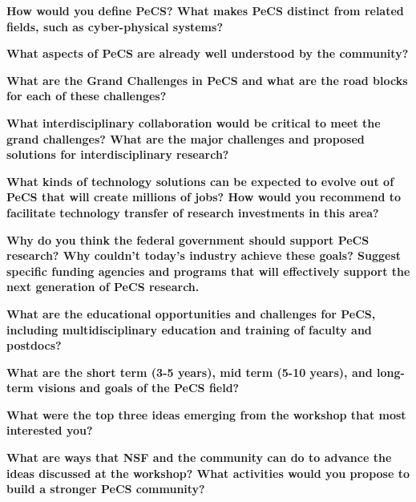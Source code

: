 \begin{flushenumbf}

\item \textbf{How would you define PeCS? What makes PeCS distinct from
related fields, such as cyber-physical systems?}

\item \textbf{What aspects of PeCS are already well understood by the
community?}

\item \textbf{What are the Grand Challenges in PeCS and what are the road
blocks for each of these challenges?}

\item \textbf{What interdisciplinary collaboration would be critical to meet
the grand challenges? What are the major challenges and proposed solutions
for interdisciplinary research?}

\item \textbf{What kinds of technology solutions can be expected to evolve
out of PeCS that will create millions of jobs? How would you recommend to
facilitate technology transfer of research investments in this area?}

\item \textbf{Why do you think the federal government should support PeCS
research? Why couldn't today's industry achieve these goals? Suggest specific
funding agencies and programs that will effectively support the next
generation of PeCS research.}

\item \textbf{What are the educational opportunities and challenges for PeCS,
including multidisciplinary education and training of faculty and postdocs?}

\item \textbf{What are the short term (3-5 years), mid term (5-10 years), and
long-term visions and goals of the PeCS field?}

\item \textbf{What were the top three ideas emerging from the workshop that
most interested you?}

\item \textbf{What are ways that NSF and the community can do to advance the
ideas discussed at the workshop? What activities would you propose to build a
stronger PeCS community?}

\end{flushenumbf}
